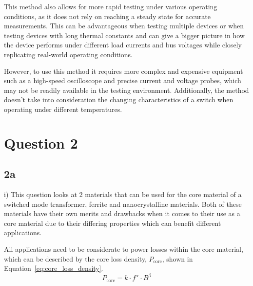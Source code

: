 \documentclass[a4paper, 12pt, titlepage]{report}
\begin{document}
This method also allows for more rapid testing under various operating conditions, as it does not rely on reaching a steady state for accurate measurements. This can be advantageous when testing multiple devices or when testing devices with long thermal constants and can give a bigger picture in how the device performs under different load currents and bus voltages while closely replicating real-world operating conditions.

However, to use this method it requires more complex and expensive equipment such as a high-speed oscilloscope and precise current and voltage probes, which may not be readily available in the testing environment. Additionally, the method doesn't take into consideration the changing characteristics of a switch when operating under different temperatures.
\chapter{Question 2}
\section{2a}
i) This question looks at 2 materials that can be used for the core material of a switched mode transformer, ferrite and nanocrystalline materials. Both of these materials have their own merits and drawbacks when it comes to their use as a core material due to their differing properties which can benefit different applications.

All applications need to be considerate to power losses within the core material, which can be described by the core loss density, \(P_{\mathrm{core}}\), shown in Equation~\ref{eq:core_loss_density}.
\begin{equation}
    P_{\mathrm{core}} = k \cdot f^\alpha \cdot B^\beta
    \label{eq:core_loss_density}
\end{equation}
\end{document}
